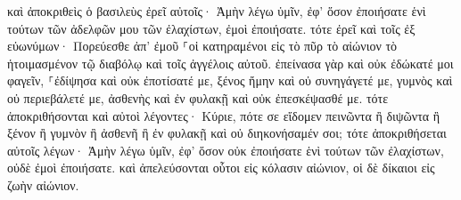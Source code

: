 \documentclass{openreader}
\begin{document}
καὶ ἀποκριθεὶς ὁ βασιλεὺς ἐρεῖ αὐτοῖς· Ἀμὴν λέγω ὑμῖν, ἐφ’ ὅσον ἐποιήσατε ἑνὶ τούτων τῶν ἀδελφῶν μου τῶν ἐλαχίστων, ἐμοὶ ἐποιήσατε. 
τότε ἐρεῖ καὶ τοῖς ἐξ εὐωνύμων· Πορεύεσθε ἀπ’ ἐμοῦ ⸀οἱ κατηραμένοι εἰς τὸ πῦρ τὸ αἰώνιον τὸ ἡτοιμασμένον τῷ διαβόλῳ καὶ τοῖς ἀγγέλοις αὐτοῦ. 
ἐπείνασα γὰρ καὶ οὐκ ἐδώκατέ μοι φαγεῖν, ⸀ἐδίψησα καὶ οὐκ ἐποτίσατέ με, 
ξένος ἤμην καὶ οὐ συνηγάγετέ με, γυμνὸς καὶ οὐ περιεβάλετέ με, ἀσθενὴς καὶ ἐν φυλακῇ καὶ οὐκ ἐπεσκέψασθέ με. 
τότε ἀποκριθήσονται καὶ αὐτοὶ λέγοντες· Κύριε, πότε σε εἴδομεν πεινῶντα ἢ διψῶντα ἢ ξένον ἢ γυμνὸν ἢ ἀσθενῆ ἢ ἐν φυλακῇ καὶ οὐ διηκονήσαμέν σοι; 
τότε ἀποκριθήσεται αὐτοῖς λέγων· Ἀμὴν λέγω ὑμῖν, ἐφ’ ὅσον οὐκ ἐποιήσατε ἑνὶ τούτων τῶν ἐλαχίστων, οὐδὲ ἐμοὶ ἐποιήσατε. 
καὶ ἀπελεύσονται οὗτοι εἰς κόλασιν αἰώνιον, οἱ δὲ δίκαιοι εἰς ζωὴν αἰώνιον. 
\end{document}
